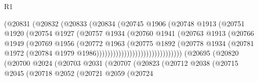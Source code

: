 \begin{lexlean}{R1}
\begin{coremodule}
                                    (@20831
                                      (@20832
                                        (@20833
                                          (@20834
                                            (@20745
                                              @1906
                                              (@20748
                                                @1913
                                                (@20751
                                                  @1920
                                                  (@20754
                                                    @1927
                                                    (@20757
                                                      @1934
                                                      (@20760
                                                        @1941
                                                        (@20763
                                                          @1913
                                                          (@20766
                                                            @1949
                                                            (@20769
                                                              @1956
                                                              (@20772
                                                                @1963
                                                                (@20775
                                                                  @1892
                                                                  (@20778
                                                                    @1934
                                                                    (@20781
                                                                      @1972
                                                                      (@20784
                                                                        @1979
                                                                        @1986)))))))))))))))))))))))))))))))
          (@20695
            (@20820
              (@20700
                @2024
                (@20703
                  @2031
                  (@20707
                    (@20823
                      (@20712
                        @2038
                        (@20715
                          @2045
                          (@20718
                            @2052
                            (@20721
                              @2059
                              (@20724

\end{coremodule}
\end{lexlean}
